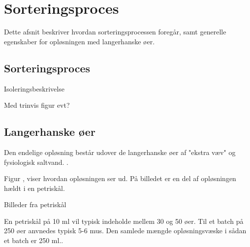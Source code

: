 \section{Sorteringsproces}
Dette afsnit beskriver hvordan sorteringsprocessen foregår, samt generelle egenskaber for opløsningen med langerhanske øer. 

\subsection{Sorteringsproces}
Isoleringsbeskrivelse 

Med trinvis figur evt? 
\subsection{Langerhanske øer}
Den endelige opløsning består udover de langerhanske øer af "ekstra væv"  og fysiologisk saltvand. .

Figur , viser hvordan opløsningen ser ud. På billedet er en del af opløsningen hældt i en petriskål.
 
Billeder fra petriskål

En petriskål på 10 ml vil typisk indeholde mellem 30 og 50 øer. Til et batch på 250 øer anvnedes typisk 5-6 mus. Den samlede mængde opløsningsvæske i sådan et batch er 250 ml.. 
